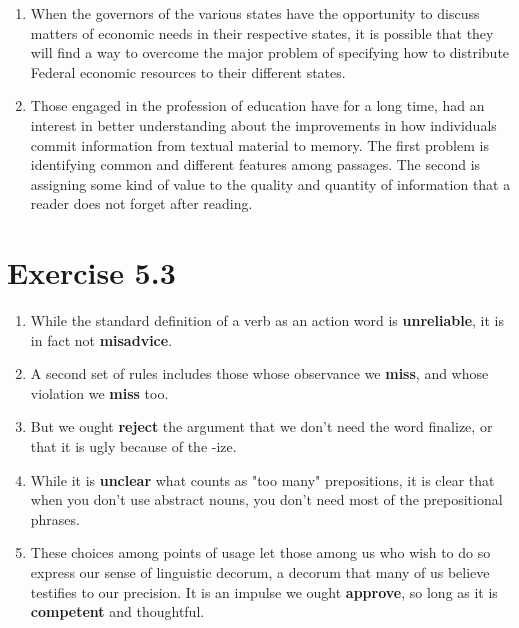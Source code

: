 \documentclass{article}
\begin{document}
\begin{enumerate}
\item When the governors of the various states have the opportunity to discuss matters of economic needs in their respective states, it is possible that they will find a way to overcome the major problem of specifying how to distribute Federal economic resources to their different states.

\item Those engaged in the profession of education have for a long time, had an interest in better understanding about the improvements in how individuals commit information from textual material to memory.  The first problem is identifying common and different features among passages. The second is assigning some kind of value to the quality and quantity of information that a reader does not forget after reading.

\end{enumerate}
  
\section*{Exercise 5.3}


\begin{enumerate}

\item While the standard definition of a verb as an action word is \textbf{unreliable}, it is in fact not \textbf{misadvice}.

\item A second set of rules includes those whose observance we \textbf{miss}, and whose violation we \textbf{miss} too.

\item But we ought \textbf{reject} the argument that we don't need the word finalize, or that it is ugly because of the -ize.

\item While it is \textbf{unclear} what counts as "too many" prepositions, it is clear that when you don't use abstract nouns, you don't need most of the prepositional phrases.

\item These choices among points of usage let those among us who wish to do so express our sense of linguistic decorum, a decorum that many of us believe testifies to our precision.
  It is an impulse we ought \textbf{approve}, so long as it is \textbf{competent} and thoughtful.

\end{enumerate}



\end{document}
